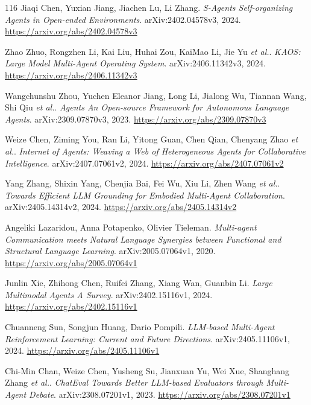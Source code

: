 \documentclass[11pt,a4paper]{article}
\begin{document}
\begin{thebibliography}{116}
Jiaqi Chen, Yuxian Jiang, Jiachen Lu, Li Zhang.
\newblock \emph{S-Agents Self-organizing Agents in Open-ended Environments}.
\newblock arXiv:2402.04578v3, 2024.
\newblock \url{https://arxiv.org/abs/2402.04578v3}

Zhao Zhuo, Rongzhen Li, Kai Liu, Huhai Zou, KaiMao Li, Jie Yu \emph{et al.}.
\newblock \emph{KAOS: Large Model Multi-Agent Operating System}.
\newblock arXiv:2406.11342v3, 2024.
\newblock \url{https://arxiv.org/abs/2406.11342v3}

Wangchunshu Zhou, Yuchen Eleanor Jiang, Long Li, Jialong Wu, Tiannan Wang, Shi Qiu \emph{et al.}.
\newblock \emph{Agents An Open-source Framework for Autonomous Language Agents}.
\newblock arXiv:2309.07870v3, 2023.
\newblock \url{https://arxiv.org/abs/2309.07870v3}

Weize Chen, Ziming You, Ran Li, Yitong Guan, Chen Qian, Chenyang Zhao \emph{et al.}.
\newblock \emph{Internet of Agents: Weaving a Web of Heterogeneous Agents for Collaborative Intelligence}.
\newblock arXiv:2407.07061v2, 2024.
\newblock \url{https://arxiv.org/abs/2407.07061v2}

Yang Zhang, Shixin Yang, Chenjia Bai, Fei Wu, Xiu Li, Zhen Wang \emph{et al.}.
\newblock \emph{Towards Efficient LLM Grounding for Embodied Multi-Agent Collaboration}.
\newblock arXiv:2405.14314v2, 2024.
\newblock \url{https://arxiv.org/abs/2405.14314v2}

Angeliki Lazaridou, Anna Potapenko, Olivier Tieleman.
\newblock \emph{Multi-agent Communication meets Natural Language Synergies between Functional and Structural Language Learning}.
\newblock arXiv:2005.07064v1, 2020.
\newblock \url{https://arxiv.org/abs/2005.07064v1}

Junlin Xie, Zhihong Chen, Ruifei Zhang, Xiang Wan, Guanbin Li.
\newblock \emph{Large Multimodal Agents A Survey}.
\newblock arXiv:2402.15116v1, 2024.
\newblock \url{https://arxiv.org/abs/2402.15116v1}

Chuanneng Sun, Songjun Huang, Dario Pompili.
\newblock \emph{LLM-based Multi-Agent Reinforcement Learning: Current and Future Directions}.
\newblock arXiv:2405.11106v1, 2024.
\newblock \url{https://arxiv.org/abs/2405.11106v1}

Chi-Min Chan, Weize Chen, Yusheng Su, Jianxuan Yu, Wei Xue, Shanghang Zhang \emph{et al.}.
\newblock \emph{ChatEval Towards Better LLM-based Evaluators through Multi-Agent Debate}.
\newblock arXiv:2308.07201v1, 2023.
\newblock \url{https://arxiv.org/abs/2308.07201v1}


\end{thebibliography}
\end{document}
